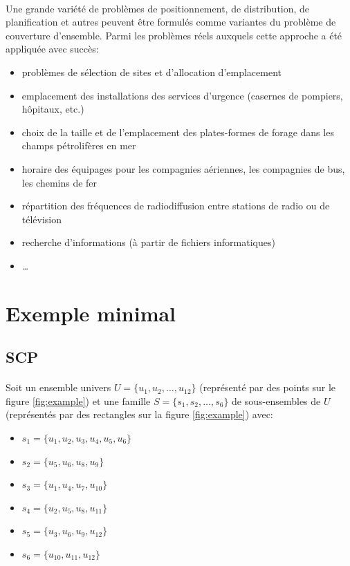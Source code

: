 \documentclass[12pt,letterpaper,twoside]{article}
\begin{document}
			\paragraph*{}
				Une grande variété de problèmes de positionnement, de distribution, de planification et autres peuvent être formulés comme variantes du problème de couverture d'ensemble. Parmi les problèmes réels auxquels cette approche a été appliquée avec succès:\cite{Balas1982}
				\begin{itemize}
					\item problèmes de sélection de sites et d'allocation d'emplacement
					\item emplacement des installations des services d'urgence (casernes de pompiers, hôpitaux, etc.)
					\item choix de la taille et de l'emplacement des plates-formes de forage dans les champs pétrolifères en mer
					\item horaire des équipages pour les compagnies aériennes, les compagnies de bus, les chemins de fer
					\item répartition des fréquences de radiodiffusion entre stations de radio ou de télévision
					\item recherche d'informations (à partir de fichiers informatiques)
					\item \ldots
				\end{itemize}
	\section{Exemple minimal}
		\subsection{SCP}
			\paragraph*{}
				Soit un ensemble univers \(U = \{u_1, u_2, \dots, u_{12}\}\) (représenté par des points sur le figure \ref{fig:example}) et une famille \(S = \{s_1, s_2, \dots, s_6\}\) de sous-ensembles de \(U\) (représentés par des rectangles sur la figure \ref{fig:example}) avec:
				\begin{itemize}
					\item \(s_1 = \{u_1, u_2, u_3, u_4, u_5, u_6\}\)
					\item \(s_2 = \{u_5, u_6, u_8, u_9\}\)
					\item \(s_3 = \{u_1, u_4, u_7, u_{10}\}\)
					\item \(s_4 = \{u_2, u_5, u_8, u_{11}\}\)
					\item \(s_5 = \{u_3, u_6, u_9, u_{12}\}\)
					\item \(s_6 = \{u_{10}, u_{11}, u_{12}\}\)
				\end{itemize}
\end{document}
